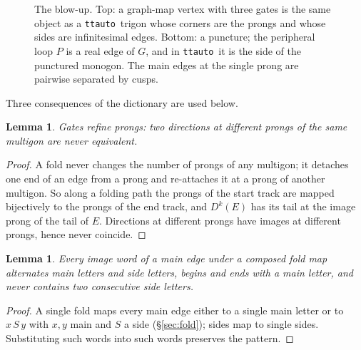 \documentclass[12pt]{amsart}
\newcommand{\Dg}{D}                       %
\newcommand{\per}{P}                      %
\newcommand{\ttauto}{\texttt{ttauto}}
\theoremstyle{plain}
\newtheorem{Lemma}[Theorem]{Lemma}
\theoremstyle{definition}
\begin{document}
\begin{figure}[t]
  \caption{The blow-up.  Top: a graph-map vertex with three gates is the
    same object as a \ttauto\ trigon whose corners are the prongs and whose
    sides are infinitesimal edges.  Bottom: a puncture; the peripheral loop
    $\per$ is a real edge of $G$, and in \ttauto\ it is the side of the
    punctured monogon.  The main edges at the single prong are pairwise
    separated by cusps.}
  \label{fig:blowup}
\end{figure}

Three consequences of the dictionary are used below.

\begin{Lemma}
  \label{lem:refine}
  Gates refine prongs: two directions at different prongs of the same
  multigon are never equivalent.
\end{Lemma}
\begin{proof}
  A fold never changes the number of prongs of any multigon; it detaches one
  end of an edge from a prong and re-attaches it at a prong of another
  multigon.  So along a folding path the prongs of the start track are
  mapped bijectively to the prongs of the end track, and $\Dg^k(E)$ has its
  tail at the image prong of the tail of $E$.  Directions at different
  prongs have images at different prongs, hence never coincide.
\end{proof}

\begin{Lemma}
  \label{lem:alternate}
  Every image word of a main edge under a composed fold map alternates
  main letters and side letters, begins and ends with a main letter, and
  never contains two consecutive side letters.
\end{Lemma}
\begin{proof}
  A single fold maps every main edge either to a single main letter or to
  $x\,S\,y$ with $x,y$ main and $S$ a side (\S\ref{sec:fold}); sides map to
  single sides.  Substituting such words into such words preserves the
  pattern.
\end{proof}
\end{document}
